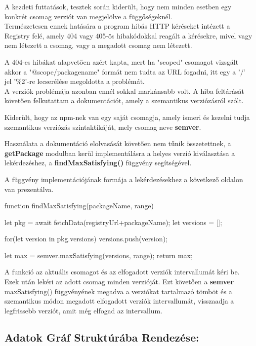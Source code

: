 A kezdeti futtatások, tesztek során kiderült, hogy nem minden esetben egy konkrét csomag verziót van megjelölve a függőségeknél.\\

Természetesen ennek hatására a program hibás HTTP kéréseket intézett a Registry felé, amely 404 vagy 405-ös hibakódokkal reagált a kérésekre, mivel vagy nem létezett a csomag, vagy a megadott csomag nem létezett. 

A 404-es hibákat alapvetően azért kapta, mert ha "scoped" csomagot vizsgált akkor a "@scope/packagename" formát nem tudta az URL fogadni, itt egy a '/' jel '\%2'-re lecserélése megoldotta a problémát.\\

A verziók problémája azonban ennél sokkal markánsabb volt. A hiba feltárását követően felkutattam a dokumentációt, amely a szemantikus verziózásról szólt. 

Kiderült, hogy az npm-nek van egy saját csomagja, amely ismeri és kezelni tudja szemantikus verziózás szintaktikáját, mely csomag neve \textbf{semver}. 

Használata a dokumentáció elolvasását követően nem tűnik összetettnek, a \textbf{getPackage} modulban kerül implementálásra a helyes verzió kiválasztása a lekérdezéshez, a \textbf{findMaxSatisfying()} függvény segítségével.

A függvény implementációjának formája a lekérdezésekhez a következő oldalon van prezentálva.

\pagebreak

\begin{js}
function findMaxSatisfying(packageName, range){
	let pkg = await fetchData(registryUrl+packageName);
	let versions = [];
	
	for(let version in pkg.versions){
		versions.push(version);
	}
	
	let max = semver.maxSatisfying(versions, range);
	return max;
}
\end{js}

A funkció az aktuális csomagot és az elfogadott verziók intervallumát kéri be. Ezek után lekéri az adott csomag minden verzióját. Ezt követően a \textbf{semver} maxSatisfying() függvényének megadva a verziókat tartalmazó tömböt és a szemantikus módon megadott elfogadott verziók intervallumát, visszaadja a legfrissebb verziót, amit még elfogad az intervallum.

\subsection{Adatok Gráf Struktúrába Rendezése:}

